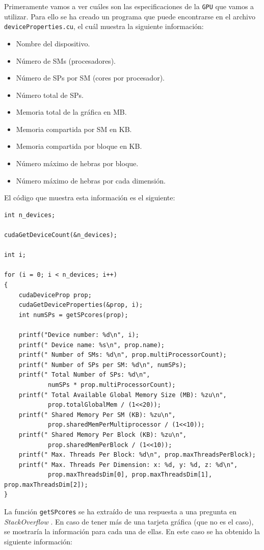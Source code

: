 \documentclass[11pt,a4paper]{article}
\begin{document}
Primeramente vamos a ver cuáles son las especificaciones de la \texttt{GPU} que vamos a
utilizar. Para ello se ha creado un programa que puede encontrarse en el archivo
\texttt{deviceProperties.cu}, el cuál muestra la siguiente información:

\begin{itemize}
  \item Nombre del dispositivo.
  \item Número de SMs (procesadores).
  \item Número de SPs por SM (cores por procesador).
  \item Número total de SPs.
  \item Memoria total de la gráfica en MB.
  \item Memoria compartida por SM en KB.
  \item Memoria compartida por bloque en KB.
  \item Número máximo de hebras por bloque.
  \item Número máximo de hebras por cada dimensión.
\end{itemize}

El código que muestra esta información es el siguiente:

\begin{lstlisting}
int n_devices;

cudaGetDeviceCount(&n_devices);

int i;

for (i = 0; i < n_devices; i++)
{
	cudaDeviceProp prop;
	cudaGetDeviceProperties(&prop, i);
	int numSPs = getSPcores(prop);

	printf("Device number: %d\n", i);
	printf(" Device name: %s\n", prop.name);
	printf(" Number of SMs: %d\n", prop.multiProcessorCount);
	printf(" Number of SPs per SM: %d\n", numSPs);
	printf(" Total Number of SPs: %d\n",
			numSPs * prop.multiProcessorCount);
	printf(" Total Available Global Memory Size (MB): %zu\n",
			prop.totalGlobalMem / (1<<20));
	printf(" Shared Memory Per SM (KB): %zu\n",
			prop.sharedMemPerMultiprocessor / (1<<10));
	printf(" Shared Memory Per Block (KB): %zu\n",
			prop.sharedMemPerBlock / (1<<10));
	printf(" Max. Threads Per Block: %d\n", prop.maxThreadsPerBlock);
	printf(" Max. Threads Per Dimension: x: %d, y: %d, z: %d\n",
			prop.maxThreadsDim[0], prop.maxThreadsDim[1], prop.maxThreadsDim[2]);
}
\end{lstlisting}

La función \texttt{getSPcores} se ha extraído de una respuesta a una pregunta en
\textit{StackOverflow} \cite{cuda-sp}. En caso de tener más de una tarjeta gráfica
(que no es el caso), se mostraría la información para cada una de ellas. En este
caso se ha obtenido la siguiente información:
\end{document}
